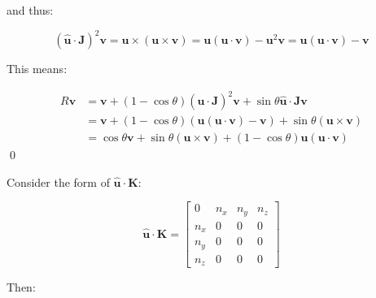 \documentclass[12pt]{article}
\begin{document}
and thus:

\begin{equation}
    (\hat{\mathbf{u}} \cdot \mathbf{J})^{2} \mathbf{v} = \mathbf{u} \times (\mathbf{u} \times \mathbf{v}) = \mathbf{u} (\mathbf{u} \cdot \mathbf{v}) - \mathbf{u}^{2} \mathbf{v} = \mathbf{u} (\mathbf{u} \cdot \mathbf{v}) - \mathbf{v}
\end{equation}

This means:

\begin{equation}
    \begin{split}
        R \mathbf{v} &= \mathbf{v} + (1 - \cos{\theta}) (\hat{\mathbf{u}} \cdot \mathbf{J})^{2} \mathbf{v} + \sin{\theta} \hat{\mathbf{u}} \cdot \mathbf{J} \mathbf{v} \\
        &= \mathbf{v} + (1 - \cos{\theta}) (\mathbf{u} (\mathbf{u} \cdot \mathbf{v}) - \mathbf{v}) + \sin{\theta} (\mathbf{u} \times \mathbf{v}) \\
        &= \cos{\theta} \mathbf{v} + \sin{\theta} (\mathbf{u} \times \mathbf{v}) + (1 - \cos{\theta}) \mathbf{u} (\mathbf{u} \cdot \mathbf{v})
    \end{split}
\end{equation}
\qed




Consider the form of $\hat{\mathbf{u}} \cdot \mathbf{K}$:

\begin{equation}
    \hat{\mathbf{u}} \cdot \mathbf{K} =
    \begin{bmatrix}
        0     & n_{x} & n_{y} & n_{z} \\
        n_{x} & 0     & 0     & 0     \\
        n_{y} & 0     & 0     & 0     \\
        n_{z} & 0     & 0     & 0
    \end{bmatrix}
\end{equation}

Then:
\end{document}
